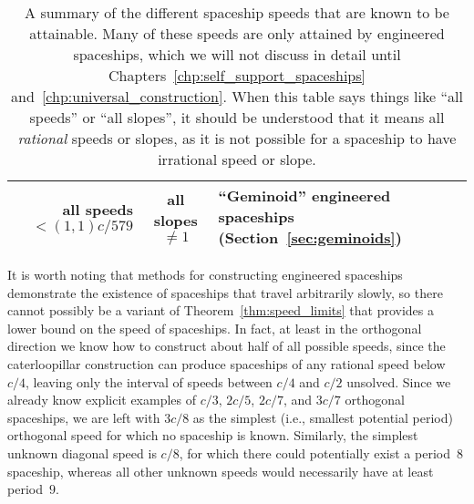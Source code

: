 \begin{table}[!htb]
\begin{center}
\begin{tabular}{r c l}
			\rowcolor{gray!20} all speeds $< (1,1)c/579$ & all slopes ${} \neq 1$ & ``Geminoid''\index{Geminoid} engineered spaceships (Section~\ref{sec:geminoids}) \\\bottomrule
		\end{tabular}
		\caption{A summary of the different spaceship speeds that are known to be attainable. Many of these speeds are only attained by engineered spaceships, which we will not discuss in detail until Chapters~\ref{chp:self_support_spaceships} and~\ref{chp:universal_construction}. When this table says things like ``all speeds'' or ``all slopes'', it should be understood that it means all \emph{rational} speeds or slopes, as it is not possible for a spaceship to have irrational speed or slope.}\label{tab:spaceship_speeds}
	\end{center}
\end{table}

It is worth noting that methods for constructing engineered spaceships demonstrate the existence of spaceships that travel arbitrarily slowly, so there cannot possibly be a variant of Theorem~\ref{thm:speed_limits} that provides a lower bound on the speed of spaceships. In fact, at least in the orthogonal direction we know how to construct about half of all possible speeds, since the caterloopillar construction can produce spaceships of any rational speed below $c/4$, leaving only the interval of speeds between $c/4$ and $c/2$ unsolved. Since we already know explicit examples of $c/3$, $2c/5$, $2c/7$, and $3c/7$ orthogonal spaceships, we are left with $3c/8$ as the simplest (i.e., smallest potential period) orthogonal speed for which no spaceship is known. Similarly, the simplest unknown diagonal speed is $c/8$, for which there could potentially exist a period~$8$ spaceship, whereas all other unknown speeds would necessarily have at least period~$9$.


